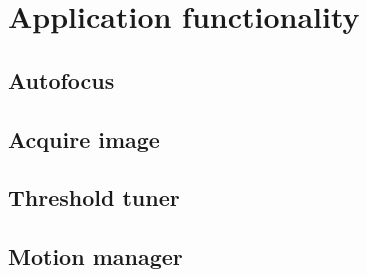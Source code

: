 \section{Application functionality}

\subsection{Autofocus}

\subsection{Acquire image}

\subsection{Threshold tuner}

\subsection{Motion manager}



